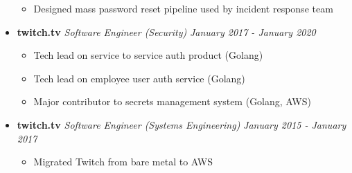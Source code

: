 \documentclass[11pt]{article}
\newcommand{\job}[4]{
  \textbf{#1} \hfill #2 \hfill \textit{#3} \hfill \textit{#4}
}
\begin{document}
\begin{itemize}[leftmargin=*,itemsep=20pt]
\begin{itemize}
	      	\item Designed mass password reset pipeline used by incident response team
	      \end{itemize}
	\item[]
	      \job
	      {twitch.tv}
	      {}
	      {Software Engineer (Security)}
	      {January 2017 - January 2020}
	      \begin{itemize}
	      	\item Tech lead on service to service auth product (Golang)
	      	\item Tech lead on employee user auth service (Golang)
	      	\item Major contributor to secrets management system (Golang, AWS)
	      \end{itemize}
	\item[]
	      \job
	      {twitch.tv}
	      {}
	      {Software Engineer (Systems Engineering)}
	      {January 2015 - January 2017}
	      \begin{itemize}
	      	\item Migrated Twitch from bare metal to AWS
	      \end{itemize}
\end{itemize}




\ 
\end{document}
